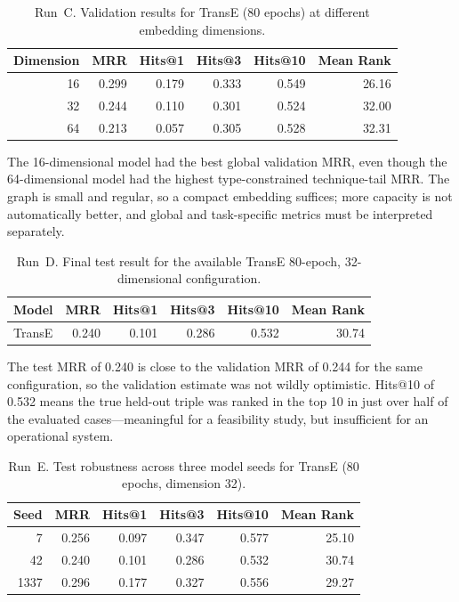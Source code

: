 \documentclass{article}
\begin{document}
\begin{table}[h]
\centering
\begin{tabular}{rrrrrr}
\toprule
\textbf{Dimension} & \textbf{MRR} & \textbf{Hits@1} & \textbf{Hits@3} & \textbf{Hits@10} & \textbf{Mean Rank} \\
\midrule
16 & 0.299 & 0.179 & 0.333 & 0.549 & 26.16 \\
32 & 0.244 & 0.110 & 0.301 & 0.524 & 32.00 \\
64 & 0.213 & 0.057 & 0.305 & 0.528 & 32.31 \\
\bottomrule
\end{tabular}
\caption{Run~C. Validation results for TransE (80 epochs) at different embedding dimensions.}
\end{table}

The 16-dimensional model had the best global validation MRR, even though the
64-dimensional model had the highest type-constrained technique-tail MRR. The
graph is small and regular, so a compact embedding suffices; more capacity is
not automatically better, and global and task-specific metrics must be
interpreted separately.

\begin{table}[h]
\centering
\begin{tabular}{lrrrrr}
\toprule
\textbf{Model} & \textbf{MRR} & \textbf{Hits@1} & \textbf{Hits@3} & \textbf{Hits@10} & \textbf{Mean Rank} \\
\midrule
TransE & 0.240 & 0.101 & 0.286 & 0.532 & 30.74 \\
\bottomrule
\end{tabular}
\caption{Run~D. Final test result for the available TransE 80-epoch, 32-dimensional configuration.}
\end{table}

The test MRR of 0.240 is close to the validation MRR of 0.244 for the same
configuration, so the validation estimate was not wildly optimistic. Hits@10 of
0.532 means the true held-out triple was ranked in the top 10 in just over half
of the evaluated cases---meaningful for a feasibility study, but insufficient for
an operational system.

\begin{table}[h]
\centering
\begin{tabular}{rrrrrr}
\toprule
\textbf{Seed} & \textbf{MRR} & \textbf{Hits@1} & \textbf{Hits@3} & \textbf{Hits@10} & \textbf{Mean Rank} \\
\midrule
7 & 0.256 & 0.097 & 0.347 & 0.577 & 25.10 \\
42 & 0.240 & 0.101 & 0.286 & 0.532 & 30.74 \\
1337 & 0.296 & 0.177 & 0.327 & 0.556 & 29.27 \\
\bottomrule
\end{tabular}
\caption{Run~E. Test robustness across three model seeds for TransE (80 epochs, dimension 32).}
\end{table}
\end{document}
